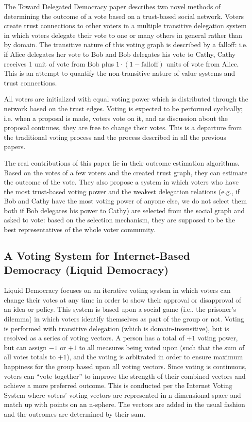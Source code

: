 \documentclass[a4paper]{acm_proc_article-sp}
\begin{document}
The Toward Delegated Democracy paper \cite{tdd} describes two novel methods of determining the outcome of a vote based on a trust-based
social network.  Voters create trust connections to other voters in a multiple transitive delegation system in which voters
delegate their vote to one or many others in general rather than by domain.  The transitive nature of this voting graph is
described by a falloff: i.e. if Alice delegates her vote to Bob and Bob delegates his vote to Cathy, Cathy receives 1 unit of
vote from Bob plus $1 \cdot (1-\mathrm{falloff})$ units of vote from Alice.  This is an attempt to quantify the non-transitive
nature of value systems and trust connections.

All voters are initialized with equal voting power which is distributed through the network based on the trust edges.  Voting
is expected to be performed cyclically; i.e. when a proposal is made, voters vote on it, and as discussion about the proposal
continues, they are free to change their votes.  This is a departure from the traditional voting process and the process
described in all the previous papers.

The real contributions of this paper lie in their outcome estimation algorithms.  Based on the votes of a few voters and the
created trust graph, they can estimate the outcome of the vote.  They also propose a system in which voters who have the most
trust-based voting power and the weakest delegation relations (e.g., if Bob and Cathy have the most voting power of anyone else,
we do not select them both if Bob delegates his power to Cathy) are selected from the social graph and asked to vote: based on
the selection mechanism, they are supposed to be the best representatives of the whole voter community.

\subsection{A Voting System for Internet-Based Democracy (Liquid Democracy)}

Liquid Democracy \cite{liquiddem} focuses on an iterative voting system in which voters can change their votes at any time in order to show
their approval or disapproval of an idea or policy.  This system is based upon a social game (i.e., the prisoner's dilemma)
in which voters identify themselves as part of the group or not.  Voting is performed with transitive delegation (which is
domain-insensitive), but is resolved as a series of voting vectors.  A person has a total of $+1$ voting power, but can
assign $-1$ or $+1$ to all measures being voted upon (such that the sum of all votes totals to $+1$), and the voting is
arbitrated in order to ensure maximum happiness for the group based upon all voting vectors.  Since voting is continuous,
voters can ``vote together'' to improve the strength of their combined vectors and achieve a more preferred outcome.  This
is conducted per the Internet Voting System where voters' voting vectors are represented in n-dimensional space and match up
with points on an n-sphere.  The vectors are added in the usual fashion and the outcomes are determined by their sum.
\end{document}
